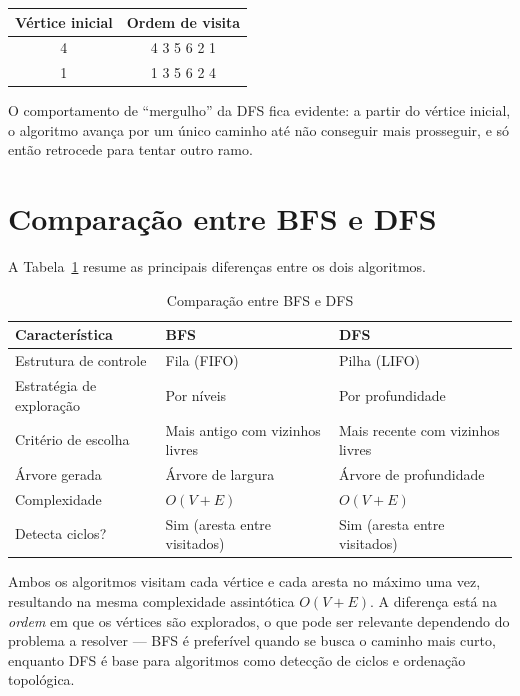 \documentclass[12pt,a4paper]{article}
\begin{document}
\begin{center}
\begin{tabular}{cc}
\toprule
\textbf{Vértice inicial} & \textbf{Ordem de visita} \\
\midrule
4 & 4 3 5 6 2 1 \\
1 & 1 3 5 6 2 4 \\
\bottomrule
\end{tabular}
\end{center}

O comportamento de ``mergulho'' da DFS fica evidente: a partir do vértice
inicial, o algoritmo avança por um único caminho até não conseguir mais
prosseguir, e só então retrocede para tentar outro ramo.

\section{Comparação entre BFS e DFS}

A Tabela~\ref{tab:comp} resume as principais diferenças entre os dois
algoritmos.

\begin{table}[H]
\centering
\caption{Comparação entre BFS e DFS}
\label{tab:comp}
\begin{tabular}{lll}
\toprule
\textbf{Característica}     & \textbf{BFS}                    & \textbf{DFS} \\
\midrule
Estrutura de controle       & Fila (FIFO)                     & Pilha (LIFO) \\
Estratégia de exploração    & Por níveis                      & Por profundidade \\
Critério de escolha         & Mais antigo com vizinhos livres & Mais recente com vizinhos livres \\
Árvore gerada               & Árvore de largura               & Árvore de profundidade \\
Complexidade                & $O(V + E)$                      & $O(V + E)$ \\
Detecta ciclos?             & Sim (aresta entre visitados)    & Sim (aresta entre visitados) \\
\bottomrule
\end{tabular}
\end{table}

Ambos os algoritmos visitam cada vértice e cada aresta no máximo uma vez,
resultando na mesma complexidade assintótica $O(V + E)$. A diferença está
na \textit{ordem} em que os vértices são explorados, o que pode ser relevante
dependendo do problema a resolver --- BFS é preferível quando se busca o
caminho mais curto, enquanto DFS é base para algoritmos como detecção de
ciclos e ordenação topológica.
\end{document}

